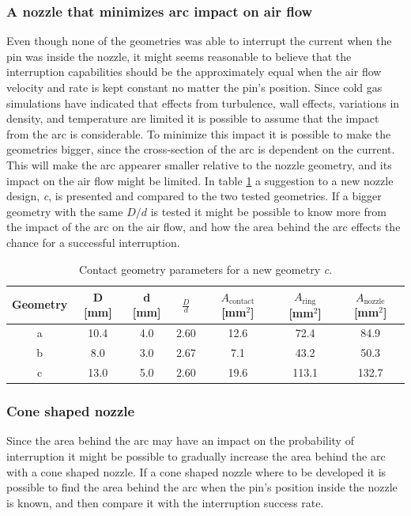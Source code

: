 \documentclass[10pt,a4paper,twoside]{article}
\begin{document}
\subsubsection{A nozzle that minimizes arc impact on air flow}
Even though none of the geometries was able to interrupt the current when the pin was inside the nozzle, it might seems reasonable to believe that the interruption capabilities should be the approximately equal when the air flow velocity and rate is kept constant no matter the pin's position. Since cold gas simulations have indicated that effects from turbulence, wall effects, variations in density, and temperature are limited it is possible to assume that the impact from the arc is considerable. To minimize this impact it is possible to make the geometries bigger, since the cross-section of the arc is dependent on the current. This will make the arc appearer smaller relative to the nozzle geometry, and its impact on the air flow might be limited. In table \ref{tab:contGeoParaNew} a suggestion to a new nozzle design, \textit{c}, is presented and compared to the two tested geometries. If a bigger geometry with the same ${D}/{d}$ is tested it might be possible to know more from the impact of the arc on the air flow, and how the area behind the arc effects the chance for a successful interruption.

\begin{table}[H]
\center
\caption{Contact geometry parameters for a new geometry \textit{c}.}
 \begin{tabular}{|c|c|c|c|c|c|c|}
\hline 
Geometry & D [mm] & d [mm] & $\frac{D}{d}$ & $A_\mathrm{{contact}}$ [mm$^2$] & $A_\mathrm{{ring}}$ [mm$^2$] & $A_\mathrm{{nozzle}}$ [mm$^2$] \\ 
\hline 
a & 10.4 & 4.0 & 2.60 & 12.6 & 72.4 & 84.9 \\ 
\hline 
b & 8.0 & 3.0 & 2.67 & 7.1 & 43.2 & 50.3 \\ 
\hline 
c & 13.0 & 5.0 & 2.60 & 19.6 & 113.1 & 132.7 \\ 
\hline
\end{tabular} 
\label{tab:contGeoParaNew}
\end{table}

\subsubsection{Cone shaped nozzle}
Since the area behind the arc may have an impact on the probability of interruption it might be possible to gradually increase the area behind the arc with a cone shaped nozzle. If a cone shaped nozzle where to be developed it is possible to find the area behind the arc when the pin's position inside the nozzle is known, and then compare it with the interruption success rate.
\end{document}
